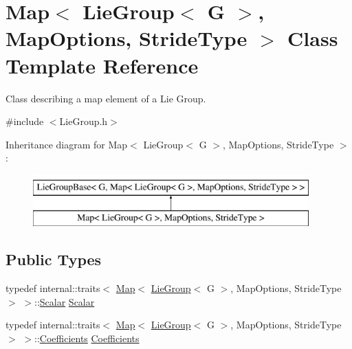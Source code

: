 \hypertarget{class_map_3_01_lie_group_3_01_g_01_4_00_01_map_options_00_01_stride_type_01_4}{}\section{Map$<$ Lie\+Group$<$ G $>$, Map\+Options, Stride\+Type $>$ Class Template Reference}
\label{class_map_3_01_lie_group_3_01_g_01_4_00_01_map_options_00_01_stride_type_01_4}


Class describing a map element of a Lie Group.  




{\ttfamily \#include $<$Lie\+Group.\+h$>$}

Inheritance diagram for Map$<$ Lie\+Group$<$ G $>$, Map\+Options, Stride\+Type $>$\+:\begin{figure}[H]
\begin{center}
\leavevmode
\includegraphics[height=2.000000cm]{class_map_3_01_lie_group_3_01_g_01_4_00_01_map_options_00_01_stride_type_01_4}
\end{center}
\end{figure}
\subsection*{Public Types}
\begin{DoxyCompactItemize}
\item 
typedef internal\+::traits$<$ \hyperlink{class_map_3_01_lie_group_3_01_g_01_4_00_01_map_options_00_01_stride_type_01_4_a141753f9a4186911b53b5b25cfd716ed}{Map}$<$ \hyperlink{class_lie_group}{Lie\+Group}$<$ G $>$, Map\+Options, Stride\+Type $>$ $>$\+::\hyperlink{class_map_3_01_lie_group_3_01_g_01_4_00_01_map_options_00_01_stride_type_01_4_ac0fdd69f3b12cdc0b88be71c2283e9ae}{Scalar} \hyperlink{class_map_3_01_lie_group_3_01_g_01_4_00_01_map_options_00_01_stride_type_01_4_ac0fdd69f3b12cdc0b88be71c2283e9ae}{Scalar}
\item 
typedef internal\+::traits$<$ \hyperlink{class_map_3_01_lie_group_3_01_g_01_4_00_01_map_options_00_01_stride_type_01_4_a141753f9a4186911b53b5b25cfd716ed}{Map}$<$ \hyperlink{class_lie_group}{Lie\+Group}$<$ G $>$, Map\+Options, Stride\+Type $>$ $>$\+::\hyperlink{class_map_3_01_lie_group_3_01_g_01_4_00_01_map_options_00_01_stride_type_01_4_a3140b440390b3c15c7361ab182a91f91}{Coefficients} \hyperlink{class_map_3_01_lie_group_3_01_g_01_4_00_01_map_options_00_01_stride_type_01_4_a3140b440390b3c15c7361ab182a91f91}{Coefficients}
\end{DoxyCompactItemize}
